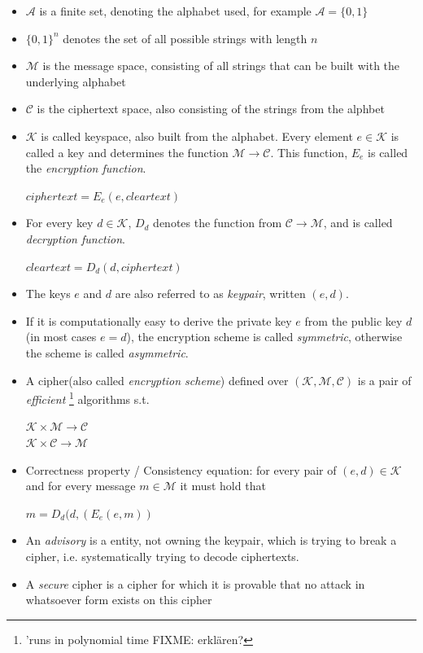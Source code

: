 \begin{itemize}
 \item $\mathcal{A}$ is a finite set, denoting the alphabet used, for example
 $\mathcal{A} = \{0, 1\}$
 \item $\{0, 1\}^n$ denotes the set of all possible strings with length $n$
 \item $\mathcal{M}$ is the message space, consisting of all strings that can be built with the 
 underlying alphabet
 \item $\mathcal{C}$ is the ciphertext space, also consisting of the strings from 
 the alphbet
 \item $\mathcal{K}$ is called keyspace, also built from the alphabet. Every element
 $e \in \mathcal{K}$ is called a key and determines the function $\mathcal{M} \rightarrow \mathcal{C}$.
 This function, $E_e$ is called the \textit{encryption function}. 
  \begin{center}
 $ciphertext = E_e(e, cleartext)$
  \end{center}

 \item For every key $d \in \mathcal{K}$, $D_d$ denotes the function from $\mathcal{C} \rightarrow
  \mathcal{M}$, and is called \textit{decryption function}.
  \begin{center}
  $cleartext  = D_d(d, ciphertext)$
    \end{center}
 \item The keys $e$ and $d$ are also referred to as \textit{keypair}, written $(e,d)$. 
 
 \item If it is computationally easy to derive the private key $e$ from the public key $d$(in most cases $e = d$), the encryption scheme
 is called \textit{symmetric}, otherwise the scheme is called \textit{asymmetric}.
 \item A cipher(also called \textit{encryption scheme}) defined over $\mathcal{(K,M,C)}$ is a pair of \textit{efficient}
 \footnote{'runs in polynomial time   FIXME: erklären?} algorithms s.t.
 \begin{center}
   $\mathcal{K} \times \mathcal{M} \rightarrow \mathcal{C}$
   \\
   $\mathcal{K} \times \mathcal{C} \rightarrow \mathcal{M}$
 
 \end{center}

 \item Correctness property / Consistency equation: for every pair of $(e,d) \in \mathcal{K}$ and for every message $m \in \mathcal{M}$ it must hold that 
 \begin{center}  
 $ m = D_d(d, (E_e(e, m))$
  \end{center}
  
 \item An \textit{advisory} is a entity, not owning the keypair, which is trying to break a cipher, i.e. systematically trying to decode ciphertexts.  
 \item A \textit{secure} cipher is a cipher for which it is provable that no attack in whatsoever form exists on this cipher 
\end{itemize}

